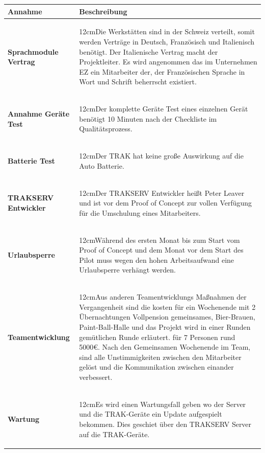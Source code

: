\documentclass[a4paper,10pt]{scrartcl}
\newcommand\Absatz[2][12cm]{\begin{varwidth}{#1}\flushleft#2\end{varwidth}}
\begin{document}
\begin{adjustbox}{width=\textwidth}
\begin{tabular}{ll} 
\toprule
\textbf{Annahme} & \textbf{Beschreibung}\\
\midrule 
\midrule
\textbf{Sprachmodule Vertrag}  & {\Absatz{Die Werkstätten sind in der Schweiz verteilt, somit werden Verträge in Deutsch, Französisch und Italienisch benötigt. Der Italienische Vertrag macht der Projektleiter.
Es wird angenommen das im Unternehmen EZ ein Mitarbeiter der, der Französischen Sprache in Wort und Schrift beherrscht existiert. 
\linebreak}} \\
\midrule
\textbf{Annahme Geräte Test}  & {\Absatz{Der komplette Geräte Test eines einzelnen Gerät benötigt
10 Minuten nach der Checkliste im Qualitätsprozess.
\linebreak}} \\
\midrule
\textbf{Batterie Test}  & {\Absatz{Der TRAK hat keine große Auswirkung auf die Auto Batterie.
\linebreak}} \\
\midrule
\textbf{TRAKSERV Entwickler}  & {\Absatz{Der TRAKSERV Entwickler heißt Peter Leaver und ist vor dem
Proof of Concept zur vollen Verfügung für die Umschulung eines Mitarbeiters.
\linebreak}} \\
\midrule
\textbf{Urlaubsperre}  & {\Absatz{Während des ersten Monat bis zum Start vom Proof of Concept und dem
Monat vor dem Start des Pilot muss wegen den hohen Arbeitsaufwand eine Urlaubsperre verhängt werden.
\linebreak}} \\
\midrule
\textbf{Teamentwicklung}  & {\Absatz{Aus anderen Teamentwicklungs Maßnahmen der Vergangenheit sind die kosten für ein Wochenende mit 2 Übernachtungen Vollpension gemeinsames, Bier-Brauen, Paint-Ball-Halle und das Projekt wird in einer Runden gemütlichen Runde erläutert.
für 7 Personen rund 5000\euro. Nach den Gemeinsamen Wochenende im Team, sind alle Unstimmigkeiten zwischen den Mitarbeiter gelöst und die Kommunikation zwischen einander verbessert.\linebreak}} \\
\midrule
\textbf{Wartung}  & {\Absatz{Es wird einen Wartungsfall geben wo der Server und die TRAK-Geräte ein Update aufgespielt bekommen. Dies geschiet über den TRAKSERV Server auf die TRAK-Geräte.
\linebreak}} \\
\midrule

\end{tabular}
\end{adjustbox}
\end{document}
